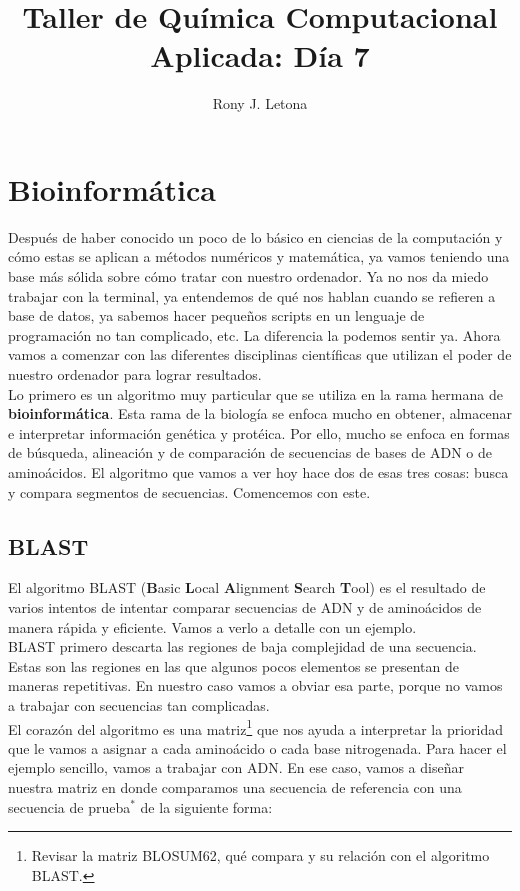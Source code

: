 \documentclass[10pt,letterpaper]{article}
\author{Rony J. Letona}
\title{Taller de Qu\'imica Computacional Aplicada: D\'ia 7}
\begin{document}
\maketitle

\section{Bioinform\'atica}
Despu\'es de haber conocido un poco de lo b\'asico en ciencias de la computaci\'on y c\'omo estas se aplican a m\'etodos num\'ericos y matem\'atica, ya vamos teniendo una base m\'as s\'olida sobre c\'omo tratar con nuestro ordenador. Ya no nos da miedo trabajar con la terminal, ya entendemos de qu\'e nos hablan cuando se refieren a base de datos, ya sabemos hacer peque\~nos scripts en un lenguaje de programaci\'on no tan complicado, etc. La diferencia la podemos sentir ya. Ahora vamos a comenzar con las diferentes disciplinas cient\'ificas que utilizan el poder de nuestro ordenador para lograr resultados.\\

Lo primero es un algoritmo muy particular que se utiliza en la rama hermana de \textbf{bioinform\'atica}. Esta rama de la biolog\'ia se enfoca mucho en obtener, almacenar e interpretar informaci\'on gen\'etica y prot\'eica. Por ello, mucho se enfoca en formas de b\'usqueda, alineaci\'on y de comparaci\'on de secuencias de bases de ADN o de amino\'acidos. El algoritmo que vamos a ver hoy hace dos de esas tres cosas: busca y compara segmentos de secuencias. Comencemos con este.\\

\subsection{BLAST}
El algoritmo BLAST (\textbf{B}asic \textbf{L}ocal \textbf{A}lignment \textbf{S}earch \textbf{T}ool) es el resultado de varios intentos de intentar comparar secuencias de ADN y de amino\'acidos de manera r\'apida y eficiente. Vamos a verlo a detalle con un ejemplo.\\

BLAST primero descarta las regiones de baja complejidad de una secuencia. Estas son las regiones en las que algunos pocos elementos se presentan de maneras repetitivas. En nuestro caso vamos a obviar esa parte, porque no vamos a trabajar con secuencias tan complicadas.\\

El coraz\'on del algoritmo es una matriz\footnote{Revisar la matriz BLOSUM62, qu\'e compara y su relaci\'on con el algoritmo BLAST.} que nos ayuda a interpretar la prioridad que le vamos a asignar a cada amino\'acido o cada base nitrogenada. Para hacer el ejemplo sencillo, vamos a trabajar con ADN. En ese caso, vamos a dise\~nar nuestra matriz en donde comparamos una secuencia de referencia con una secuencia de prueba$^{*}$ de la siguiente forma:
\end{document}
